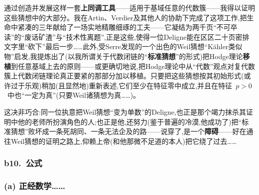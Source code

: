 通过创造并发展这样一套\textbf{上同调工具}——适用于基域任意的代数簇——我得以证明这些猜想中的大部分。我在Artin、Verdier及其他人的协助下完成了这项工作,把生命中紧凑的三年献给了一场实地精雕细琢的工夫——它凝结为两千页“不可卒读”的“废话矿渣”与“技术性离题”,正是这些,使得一位Deligne能在区区二十页密排文字里“砍下”最后一步……此外,受Serre发现的一个出色的Weil猜想“Kähler类似物”启发,我提炼出了(以我所谓关于代数闭链的“\textbf{标准猜想}”的形式)把Hodge理论\textbf{移植}到任意基域上去的原则——或更确切地说,把Hodge理论中从“代数”观点对复代数簇上代数闭链理论真正要紧的那部分加以移植。只要把这些猜想按其初始形式(或许过于乐观)稍加(且显然地)重新表述,它们至少在特征零中成立,并且在特征~$p>0$~中也“一定为真”(只要Weil诸猜想为真……)。

这决非巧合:同一位执意把Weil猜想“变为单数”的Deligne,也正是那个竭力抹杀其证明中他的老师所扮演角色的人;也正是他,还努力(鉴于普遍的冷漠,他成功了)把“标准猜想”败坏成一条死胡同、一条无法企及的路——说穿了,是一个\textbf{障碍}——好在通往Weil猜想的证明之路上,仰赖上帝(和他那微不足道的本人)把它绕了过去……

\subsubsection*{b10.~公式}

\subsubsection*{(a) 正经数学……}


